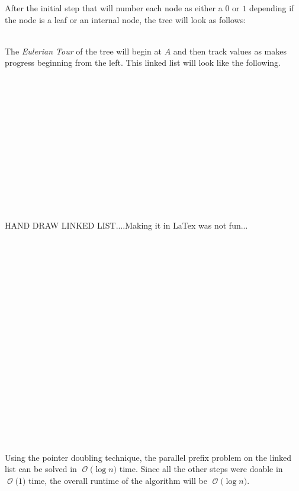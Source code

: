 \documentclass[12pt]{article}
\newcommand{\BigO}[1]{\ensuremath{\operatorname{\mathcal{O}}\bigl(#1\bigr)}}
\begin{document}
After the initial step that will number each node as either a $0$ or
$1$ depending if the node is a leaf or an internal node, the tree
will look as follows:\\\\ 
\begin{center}
\end{center} 
The \textit{Eulerian Tour} of the tree will begin at $A$ and then
track values as makes progress beginning from the left.  This linked
list will look like the following.\\\\ 
\\\\
\\\\
\\\\
\\\\
\\\\
\\\\
HAND DRAW LINKED LIST....Making it in LaTex was not fun...
\\\\
\\\\
\\\\
\\\\
\\\\
\\\\
\\\\
\\\\
\\\\
\\\\
Using the pointer doubling technique, the parallel prefix problem on
the linked list can be solved in \BigO{\log n} time.  Since all the
other steps were doable in \BigO{1} time, the overall runtime of the
algorithm will be \BigO{\log n}.
\end{document}
